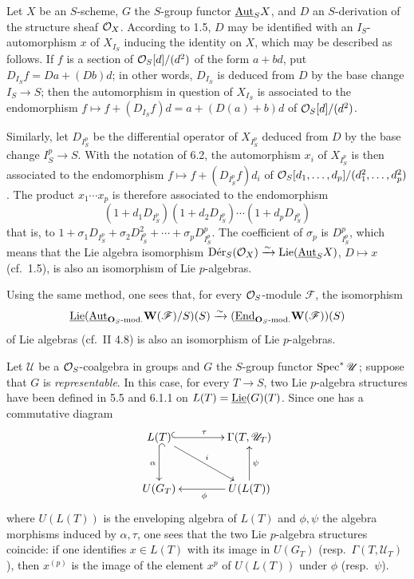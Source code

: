 Let $X$ be an $S$-scheme, $G$ the $S$-group functor $\underline{\operatorname{Aut}}_S X$, and $D$ an $S$-derivation of the structure sheaf $\mathcal{O}_X$. According to 1.5, $D$ may be identified with an $I_S$-automorphism $x$ of $X_{I_S}$ inducing the identity on $X$, which may be described as follows. If $f$ is a section of $\mathcal{O}_S[d]/(d^2)$ of the form $a+bd$, put $D_{I_S}f=Da+(Db)d$; in other words, $D_{I_S}$ is deduced from $D$ by the base change $I_S\to S$; then the automorphism in question of $X_{I_S}$ is associated to the endomorphism $f\mapsto f+(D_{I_S}f)d=a+(D(a)+b)d$ of $\mathcal{O}_S[d]/(d^2)$.

Similarly, let $D_{I_S^p}$ be the differential operator of $X_{I_S^p}$ deduced from $D$ by the base change $I_S^p\to S$. With the notation of 6.2, the automorphism $x_i$ of $X_{I_S^p}$ is then associated to the endomorphism $f\mapsto f+(D_{I_S^p}f)d_i$ of $\mathcal{O}_S[d_1,\ldots,d_p]/(d_1^2,\ldots,d_p^2)$. The product $x_1\cdots x_p$ is therefore associated to the endomorphism
\[
(1+d_1D_{I_S^p})(1+d_2D_{I_S^p})\cdots(1+d_pD_{I_S^p})
\]
that is, to $1+\sigma_1D_{I_S^p}+\sigma_2D_{I_S^p}^2+\cdots+\sigma_pD_{I_S^p}^p$.
The coefficient of $\sigma_p$ is $D_{I_S^p}^p$, which means that the Lie algebra isomorphism $\operatorname{D\acute er}_S(\mathcal{O}_X)\xrightarrow{\sim}\operatorname{Lie}(\underline{\operatorname{Aut}}_S X)$, $D\mapsto x$ (cf.\ 1.5), is also an isomorphism of Lie $p$-algebras.

Using the same method, one sees that, for every $\mathcal{O}_S$-module $\mathscr F$, the isomorphism
\[
\underline{\operatorname{Lie}}(\underline{\operatorname{Aut}}_{\mathbf O_S\text{-mod.}}\mathbf W(\mathscr F)/S)(S)\xrightarrow{\sim}(\underline{\operatorname{End}}_{\mathbf O_S\text{-mod.}}\mathbf W(\mathscr F))(S)
\]
of Lie algebras (cf.\ II 4.8) is also an isomorphism of Lie $p$-algebras.

Let $\mathscr U$ be a $\mathcal{O}_S$-coalgebra in groups and $G$ the $S$-group functor $\operatorname{Spec}^*\mathscr U$; suppose that $G$ is \emph{representable}. In this case, for every $T\to S$, two Lie $p$-algebra structures have been defined in 5.5 and 6.1.1 on $L(T)=\underline{\operatorname{Lie}}(G)(T)$. Since one has a commutative diagram
\[
\xymatrix@C=4em@R=3em{L(T)\ar@{^{(}->}[r]^\tau\ar@{^{(}->}[d]_\alpha\ar[dr]^i&\Gamma(T,\mathscr U_T)\\
U(G_T)&U(L(T))\ar[l]^\phi\ar[u]_\psi}
\]
where $U(L(T))$ is the enveloping algebra of $L(T)$ and $\phi,\psi$ the algebra morphisms induced by $\alpha,\tau$, one sees that the two Lie $p$-algebra structures coincide: if one identifies $x\in L(T)$ with its image in $U(G_T)$ (resp.\ $\Gamma(T,\mathscr U_T)$), then $x^{(p)}$ is the image of the element $x^p$ of $U(L(T))$ under $\phi$ (resp.\ $\psi$).

